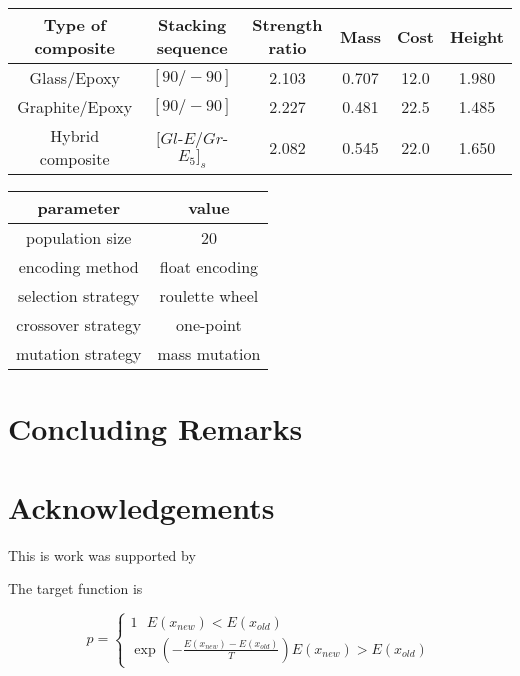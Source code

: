 \documentclass[smallextended]{svjour3}       %
\begin{document}
\begin{tabular}{cccccc}
	\toprule
	Type of composite & Stacking sequence    & Strength ratio  & Mass &  Cost   & Height\\
	\midrule
	Glass/Epoxy       & $[90/-90]$           & 2.103           & 0.707 &  12.0  & 1.980  \\
	Graphite/Epoxy    & $[90/-90]$           & 2.227           & 0.481 &  22.5  & 1.485 \\
	Hybrid composite  &  $[Gl${\text -}$E/Gr${\text -}$E_{5}]_s$ & 2.082           & 0.545 &  22.0  & 1.650 \\
	\bottomrule
\end{tabular}





\begin{tabular}{cc}
	\toprule
	parameter & value \\
	\midrule
	population size      & 20               \\
    encoding method      & float encoding  \\
	selection strategy   & roulette wheel  \\
	crossover strategy   & one-point \\
	mutation strategy    & mass mutation   \\
	\bottomrule
\end{tabular}



\section{Concluding Remarks}
\section{Acknowledgements}
This is work was supported by 






The target function is 


\begin{equation}
p=\left\{
    \begin{array}{c}{1}  
        \text{      }   E\left(x_{n e w}\right)<E\left(x_{o l d}\right)
        \\ 
{\exp \left(-\frac{E\left(x_{new}\right)-E\left(x_{old}\right)}{T}\right)}
                        E\left(x_{n e w}\right)>E\left(x_{o l d}\right)
\end{array}\right.
\end{equation}
\end{document}
